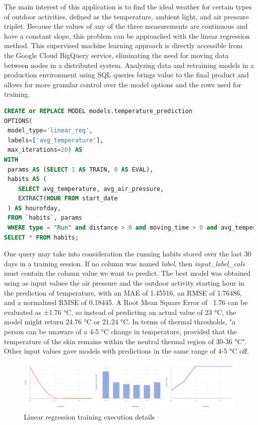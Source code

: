 The main interest of this application is to find the ideal weather for certain types of outdoor activities, defined as the temperature, ambient light, and air pressure triplet. Because the values of any of the three measurements are continuous and have a constant slope, this problem can be approached with the linear regression method. This supervised machine learning approach is directly accessible from the Google Cloud BigQuery service, eliminating the need for moving data between nodes in a distributed system. Analyzing data and retraining models in a production environment using SQL queries brings value to the final product and allows for more granular control over the model options and the rows used for training.

\begin{lstlisting}[language=SQL]
CREATE or REPLACE MODEL models.temperature_prediction
OPTIONS(
 model_type='linear_reg', 
 labels=['avg_temperature'], 
 max_iterations=20) AS 
WITH  
 params AS (SELECT 1 AS TRAIN, 0 AS EVAL),
 habits AS (
    SELECT avg_temperature, avg_air_pressure, 
    EXTRACT(HOUR FROM start_date
 ) AS hourofday,
 FROM `habits`, params
 WHERE type = "Run" and distance > 0 and moving_time > 0 and avg_temperature IS NOT NULL and MOD(ABS(FARM_FINGERPRINT(CAST(start_date AS STRING))), 2) = params.TRAIN and TIMESTAMP_DIFF(CURRENT_TIMESTAMP(), start_date, DAY) <= 30)
SELECT * FROM habits;
\end{lstlisting}

One query may take into consideration the running habits stored over the last 30 days in a training session. If no column was named \textit{label}, then \textit{input\_label\_cols} must contain the column value we want to predict. \cite{a2} The best model was obtained using as input values the air pressure and the outdoor activity starting hour in the prediction of temperature, with an MAE of 1.45516, an RMSE of 1.76486, and a normalized RMSE of 0.18445. A Root Mean Square Error of ~1.76 can be evaluated as ±1.76 °C, so instead of predicting an actual value of 23 °C, the model might return 24.76 °C or 21.24 °C. In terms of thermal thresholds, "a person can be unaware of a 4-5 °C change in temperature, provided that the temperature of the skin remains within the neutral thermal region of 30-36 °C". \cite{a1} Other input values gave models with predictions in the same range of 4-5 °C off.

\begin{figure}[!htb]
    \centering
    \includegraphics[width = 15.5cm]{figures/lr.jpg}
    \caption{Linear regression training execution details}
    \label{fig:app_flow}
\end{figure}


